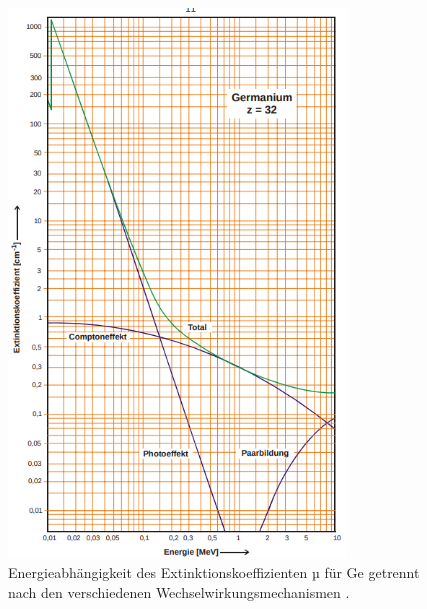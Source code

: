 \begin{figure}
\centering
\includegraphics[width = 0.8\textwidth]{pics/extinktionskoeffizient.png}
\caption{Energieabhängigkeit des Extinktionskoeffizienten µ für Ge getrennt nach den verschiedenen
Wechselwirkungsmechanismen \cite{anleitungv18}.}
\label{fig:extinktionskoeffizient}
\end{figure}

